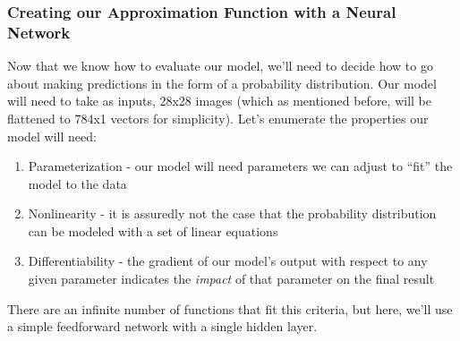 \documentclass[
]{article}
\providecommand{\tightlist}{%
  \setlength{\itemsep}{0pt}\setlength{\parskip}{0pt}}
\begin{document}
\hypertarget{creating-our-approximation-function-with-a-neural-network}{%
\subsubsection{Creating our Approximation Function with a Neural
Network}\label{creating-our-approximation-function-with-a-neural-network}}

Now that we know how to evaluate our model, we'll need to decide how to
go about making predictions in the form of a probability distribution.
Our model will need to take as inputs, 28x28 images (which as mentioned
before, will be flattened to 784x1 vectors for simplicity). Let's
enumerate the properties our model will need:

\begin{enumerate}
\def\labelenumi{\arabic{enumi}.}
\tightlist
\item
  Parameterization - our model will need parameters we can adjust to
  ``fit'' the model to the data
\item
  Nonlinearity - it is assuredly not the case that the probability
  distribution can be modeled with a set of linear equations
\item
  Differentiability - the gradient of our model's output with respect to
  any given parameter indicates the \emph{impact} of that parameter on
  the final result
\end{enumerate}

There are an infinite number of functions that fit this criteria, but
here, we'll use a simple feedforward network with a single hidden layer.
\end{document}
